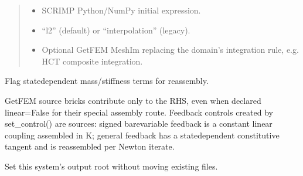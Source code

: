 \documentclass[letterpaper,10pt,english]{sphinxmanual}
\begin{document}
\begin{fulllineitems}
\begin{fulllineitems}
\begin{quote}
\begin{description}
\begin{itemize}
\item {} 
\sphinxAtStartPar
{} \textendash{} SCRIMP Python/NumPy initial expression.

\item {} 
\sphinxAtStartPar
{} \textendash{} “l2” (default) or “interpolation” (legacy).

\item {} 
\sphinxAtStartPar
{} \textendash{} Optional GetFEM MeshIm replacing the domain’s
integration rule, e.g. HCT composite integration.

\end{itemize}

\end{description}\end{quote}

\end{fulllineitems}


\begin{fulllineitems}
\label{\detokenize{scrimp:scrimp.dphs.DPHS.set_linear_flags}}
\pysigstartsignatures
\pysiglinewithargsret
{}
{}
{}
\pysigstopsignatures
\sphinxAtStartPar
Flag state\sphinxhyphen{}dependent mass/stiffness terms for reassembly.

\sphinxAtStartPar
GetFEM source bricks contribute only to the RHS, even when
declared linear=False for their special assembly route.
Feedback controls created by set\_control() are  sources:
signed bare\sphinxhyphen{}variable feedback is a constant linear coupling
assembled in K; general feedback has a state\sphinxhyphen{}dependent
constitutive tangent and is reassembled per Newton iterate.

\end{fulllineitems}


\begin{fulllineitems}
\label{\detokenize{scrimp:scrimp.dphs.DPHS.set_output_directory}}
\pysigstartsignatures
\pysiglinewithargsret
{}
{}
{}
\pysigstopsignatures
\sphinxAtStartPar
Set this system’s output root without moving existing files.


\end{fulllineitems}
\end{fulllineitems}
\end{document}

